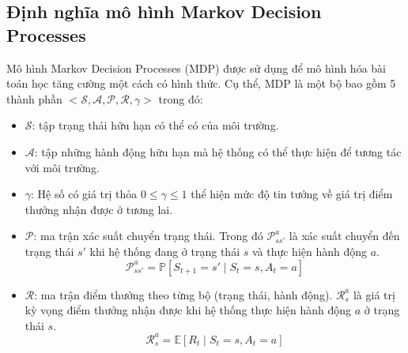 \subsection{Định nghĩa mô hình Markov Decision Processes}
Mô hình Markov Decision Processes (MDP) được sử dụng để mô hình hóa bài toán học tăng cường một cách có hình thức. Cụ thể, MDP là một bộ bao gồm 5 thành phần $<\mathcal{S, A, P, R, \gamma}>$ trong đó:
\begin{itemize}
	\item $\mathcal{S}$: tập trạng thái hữu hạn có thể có của môi trường.
	\item $\mathcal{A}$: tập những hành động hữu hạn mà hệ thống có thể thực hiện để tương tác với môi trường.
	\item $\gamma$: Hệ số có giá trị thỏa $0\leqslant \gamma \leqslant 1$ thể hiện mức độ tin tưởng về giá trị điểm thưởng nhận được ở tương lai.
	\item $\mathcal{P}$: ma trận xác suất chuyển trạng thái. Trong đó $\mathcal{P}_{ss'}^{a}$ là xác suất chuyển đến trạng thái $s'$ khi hệ thống đang ở trạng thái $s$ và thực hiện hành động $a$.
	\begin{equation}
	\mathcal{P}_{ss'}^{a} = \mathbb{P}[\mathit{S_{t+1}} = s' \mid \mathit{S_{t}} = s, \mathit{A_{t}} = a]
	\end{equation}
	\item $\mathcal{R}$: ma trận điểm thưởng theo từng bộ (trạng thái, hành động). $\mathcal{R}_{s}^a$ là giá trị kỳ vọng điểm thưởng nhận được khi hệ thống thực hiện hành động $a$ ở trạng thái $s$.
	\begin{equation}
	\mathcal{R}_{s}^a = \mathbb{E}[\mathit{R_{t}} \mid \mathit{S_{t}} = s, \mathit{A_{t}} = a]
	\end{equation}				
\end{itemize}

